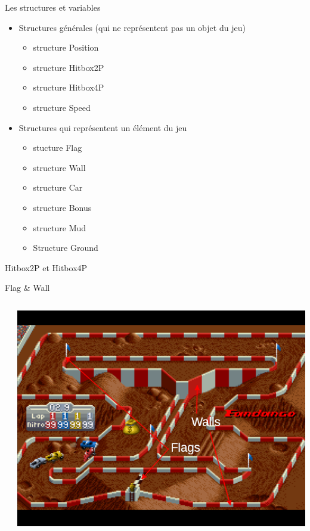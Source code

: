 \documentclass[10pt,dvipsnames,final]{beamer}
\newcommand{\midcolumn}[2]{
\begin{columns}
	\begin{column}{0.5\textwidth}
		#1
	\end{column}
	\begin{column}{0.5\textwidth}
		#2
	\end{column}
\end{columns}
}
\begin{document}
\begin{frame}{Les structures et variables}
\begin{itemize}
\item Structures générales (qui ne représentent pas un objet du jeu)
\begin{itemize}
\item structure Position
\item structure Hitbox2P
\item structure Hitbox4P
\item structure Speed
\end{itemize}
\item Structures qui représentent un élément du jeu
\begin{itemize}
\item stucture Flag
\item structure Wall
\item structure Car
\item structure Bonus
\item structure Mud
\item Structure Ground
\end{itemize}
\end{itemize}
\end{frame}

\begin{frame}{Hitbox2P et Hitbox4P}


\end{frame}

\begin{frame}{Flag \& Wall}
\midcolumn{}{\includegraphics[width=\textwidth]{presentationfiles/flags-walls-sor}}
\end{frame}
\end{document}

